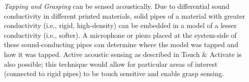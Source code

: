 



\emph{Tapping and Grasping} can be sensed acoustically.  Due to differential sound conductivity in different printed materials, solid pipes of a material with greater conductivity (i.e., rigid, high-density) can be embedded in a model of a lesser conductivity (i.e., softer).  A microphone or piezo placed at the system-side of these sound-conducting pipes can determine where the model was tapped and how it was tapped.  Active acoustic sensing as described in Touch \& Activate \cite{Ono-touchandactivate} is also possible; this technique would allow for particular areas of interest (connected to rigid pipes) to be touch sensitive and enable grasp sensing.


